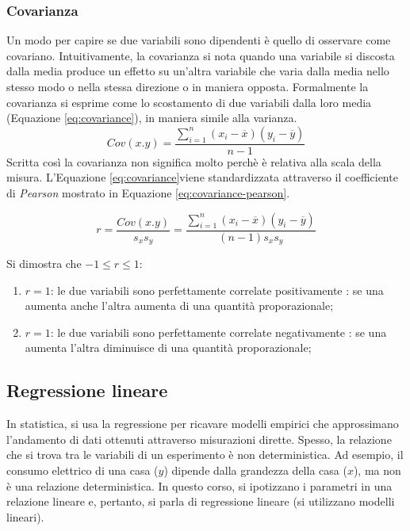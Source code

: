 \documentclass{article}
\begin{document}
\subsubsection{Covarianza}
Un modo per capire se due variabili sono dipendenti è quello di osservare come covariano. 
Intuitivamente, la covarianza si nota quando una variabile si discosta dalla media produce
un effetto su un'altra variabile che varia dalla media nello stesso modo o nella stessa 
direzione o in maniera opposta. Formalmente la covarianza si esprime come lo scostamento
di due variabili dalla loro media (Equazione \ref{eq:covariance}), in maniera simile alla
varianza.
\begin{equation}
  Cov(x.y) = \frac{\displaystyle\sum_{i=1}^{n}(x_i - \overline{x})(y_i - \overline{y})}{n-1}
  \label{eq:covariance}
\end{equation}
Scritta così la covarianza non significa molto perchè è relativa alla scala della misura. 
L'Equazione \ref{eq:covariance}viene standardizzata attraverso il coefficiente di 
\textit{Pearson} mostrato in Equazione \ref{eq:covariance-pearson}.

\begin{equation}
  r =\frac{Cov(x.y)}{s_xs_y} =
  \frac{\displaystyle\sum_{i=1}^{n}(x_i - \overline{x})(y_i - \overline{y})}{(n-1)s_xs_y}
  \label{eq:covariance-pearson}
\end{equation}

Si dimostra che $-1 \leq r \leq 1$:
\begin{enumerate}[label=(\alph*)] 
  \item $r = 1$: le due variabili sono perfettamente correlate positivamente : se una aumenta
    anche l'altra aumenta di una quantità proporazionale;
  \item $r = 1$: le due variabili sono perfettamente correlate negativamente : se una aumenta 
    l'altra diminuisce di una quantità proporazionale;
\end{enumerate}

\clearpage
\subsection{Regressione lineare}
In statistica, si usa la regressione per ricavare modelli empirici che approssimano
l'andamento di dati ottenuti attraverso misurazioni dirette. Spesso, la relazione che si 
trova tra le variabili di un esperimento è non deterministica. Ad esempio, il consumo 
elettrico di una casa ($y$) dipende dalla grandezza della casa ($x$), ma non è una relazione
deterministica. In questo corso, si ipotizzano i parametri in una relazione lineare e, 
pertanto, si parla di regressione lineare (si utilizzano modelli lineari).
\end{document}
